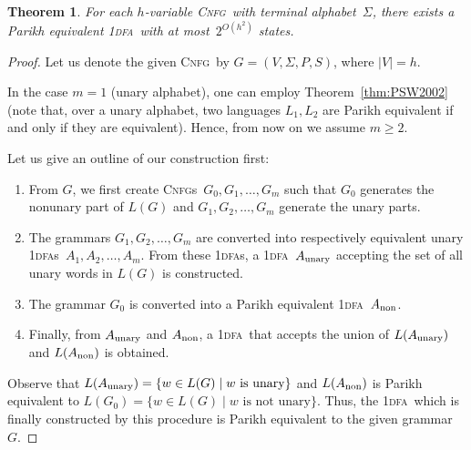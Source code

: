 \documentclass[11pt]{article}
\newcommand*{\ow}{\textsc{1}}
\newcommand*{\owdfa}{\ow\textsc{dfa}}
\newcommand*{\owdfas}{\ow\textsc{dfa}s}
\newcommand*{\cnfg}{\textsc{Cnfg}}
\newcommand*{\cnfgs}{\textsc{Cnfg}s}
\newtheorem{theorem}{Theorem}[section]
\begin{document}
\begin{theorem}\label{thm:CNFG_to_DFA}
	For each $h$-variable \cnfg\ with terminal alphabet~$\Sigma$, there exists a Parikh 
	equivalent \owdfa\ with at most~$2^{O(h^2)}$ states. 
\end{theorem}
\begin{proof}
Let us denote the given \cnfg\ by $G = (V, \Sigma, P, S)$, where $|V| = h$. 

In the case $m = 1$ (unary alphabet), one can employ Theorem~\ref{thm:PSW2002} (note that, over a unary alphabet, two languages $L_1, L_2$ are Parikh equivalent if and only if they are equivalent). 
Hence, {}from now on we assume $m\geq 2$. 

Let us give an outline of our construction first: 
\begin{enumerate}
\item\label{step:split}
	{}From $G$, we first create \cnfgs\ $G_0, G_1, \ldots, G_m$ such that $G_0$ generates the nonunary part of $L(G)$ and
	$G_1,G_2,\ldots,G_m$ generate the unary parts.
\item\label{step:unary}	
	The grammars $G_1, G_2, \ldots, G_m$ are converted into respectively equivalent unary \owdfas\ $A_1, A_2, \ldots, A_m$.
	{}From these \owdfas, a \owdfa\ $A_{\rm unary}$ accepting the set of all unary
	words in $L(G)$ is constructed. 
\item\label{step:CNFG_to_DFA}
	The grammar $G_0$ is converted into a Parikh equivalent \owdfa~$A_{\rm non}$.
\item\label{step:last_merge}
	Finally, {}from $A_{\rm unary}$ and $A_{\rm non}$, a \owdfa\ that accepts the union of $L(A_{\rm unary})$ and $L(A_{\rm non})$
	is obtained. 
\end{enumerate}
Observe that $L(A_{\rm unary}) = \{w \in L(G) \mid \mbox{$w$ is unary}\}$ and $L(A_{\rm non})$ is Parikh equivalent to $L(G_0) = \{w \in L(G) \mid \mbox{$w$ is not unary}\}$. 
Thus, the \owdfa\ which is finally constructed by this procedure is Parikh equivalent to the given grammar~$G$.



\end{proof}
\end{document}
